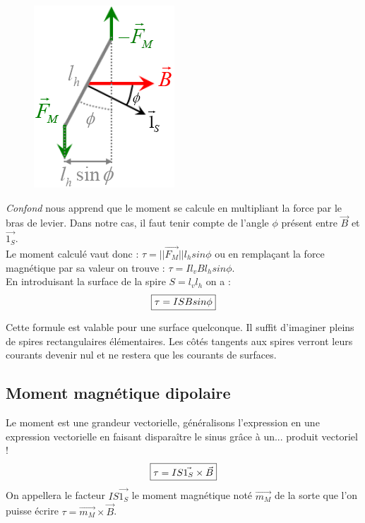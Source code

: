 \documentclass	[11pt, a4paper, openany]{book}
\begin{document}
\begin{figure}
	\includegraphics[scale=0.50]{magneto/image14.png}
\end{figure}

\textit{Confond} nous apprend que le moment se calcule en multipliant la force par le bras de levier. Dans notre cas, il faut tenir compte de l'angle $\phi$ présent entre $\vec{B}$ et $\vec{1_S}$.\\



Le moment calculé vaut donc : $\tau = ||\vec{F_M}||l_h sin\phi$ ou en remplaçant la force magnétique par sa valeur on trouve : $\tau = I l_v B l_h sin\phi$.\\
En introduisant la surface de la spire $ S = l_v l_h$ on a :
\begin{equation}
	\fbox{$\tau = ISBsin\phi$}
\end{equation}

Cette formule est valable pour une surface quelconque. Il suffit d'imaginer pleins de spires rectangulaires élémentaires. Les côtés tangents aux spires verront leurs courants devenir nul et ne restera que les courants de surfaces.
\subsection{Moment magnétique dipolaire}
Le moment est une grandeur vectorielle, généralisons l'expression en une expression vectorielle en faisant disparaître le sinus grâce à un... produit vectoriel !
\begin{equation}
	\fbox{$\tau = IS\vec{1_S} \times \vec{B}$}
\end{equation}
On appellera le facteur $IS\vec{1_S}$ le moment magnétique noté $\vec{m_M}$ de la sorte que l'on puisse écrire $\tau = \vec{m_M} \times \vec{B}$.
\end{document}
